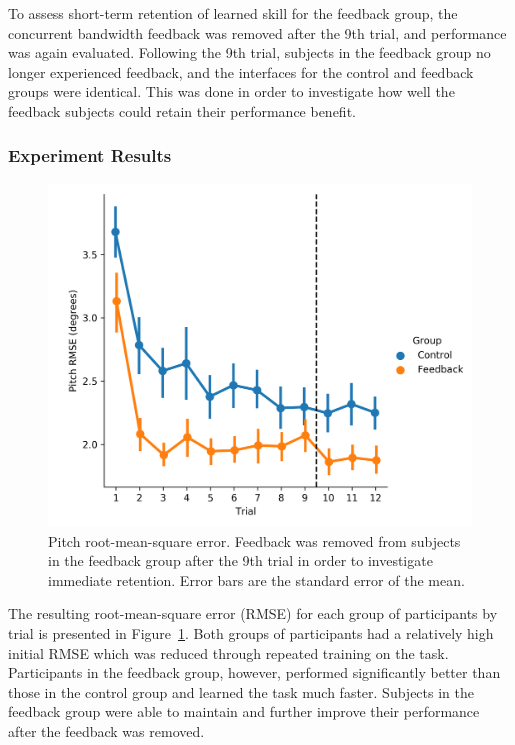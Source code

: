 To assess short-term retention of learned skill for the feedback group, the concurrent bandwidth feedback was removed after the 9th trial, and performance was again evaluated.
Following the 9th trial, subjects in the feedback group no longer experienced feedback, and the interfaces for the control and feedback groups were identical.
This was done in order to investigate how well the feedback subjects could retain their performance benefit.

\subsubsection{Experiment Results}
\begin{figure}[b]
    \centering
    \includegraphics[width=0.75\linewidth]{figures/Modeling/prms_arx.png}
    \caption[Pitch root-mean-square error]{Pitch root-mean-square error. Feedback was removed from subjects in the feedback group after the 9th trial in order to investigate immediate retention. Error bars are the standard error of the mean.}
    \label{fig:prmse}
\end{figure}

The resulting root-mean-square error (RMSE) for each group of participants by trial is presented in Figure~\ref{fig:prmse}.
Both groups of participants had a relatively high initial RMSE which was reduced through repeated training on the task.
Participants in the feedback group, however, performed significantly better than those in the control group and learned the task much faster.
Subjects in the feedback group were able to maintain and further improve their performance after the feedback was removed.

